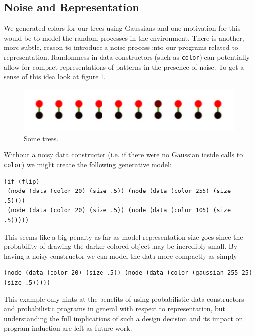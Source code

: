 \documentclass[a4paper,10pt]{article}
\begin{document}
\subsection{Noise and Representation}
We generated colors for our trees using Gaussians and one motivation for this would be to model the random processes in the environment.  There is another, more subtle, reason to introduce a noise process into our programs related to representation.  Randomness in data constructors (such as \texttt{color}) can potentially allow for compact representations of patterns in the presence of noise.  To get a sense of this idea look at figure \ref{fig:noiseCons}. 
\begin{figure}[h]
\begin{center}
\includegraphics[scale=.60]{noisyConstructor.pdf}
\end{center}
\caption{Some trees.}
\label{fig:noiseCons}
\end{figure}
Without a noisy data constructor (i.e. if there were no Gaussian inside calls to \texttt{color}) we might create the following generative model:
\begin{lstlisting}
(if (flip)
 (node (data (color 20) (size .5)) (node (data (color 255) (size .5))))
 (node (data (color 20) (size .5)) (node (data (color 105) (size .5)))))
\end{lstlisting}
This seems like a big penalty as far as model representation size goes since the probability of drawing the darker colored object may be incredibly small.  By having a noisy constructor we can model the data more compactly as simply 
\begin{lstlisting}
(node (data (color 20) (size .5)) (node (data (color (gaussian 255 25) (size .5)))))
\end{lstlisting}
This example only hints at the benefits of using probabilistic data constructors and probabilistic programs in general with respect to representation, but understanding the full implications of such a design decision and its impact on program induction are left as future work.
\end{document}
